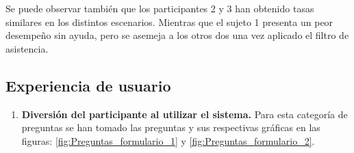Se puede observar también que los participantes 2 y 3 han obtenido tasas
similares en los distintos escenarios. Mientras que el sujeto 1 presenta un
peor desempeño sin ayuda, pero se asemeja a los otros dos una vez aplicado el
filtro de asistencia.

\subsection{Experiencia de usuario}
\label{subsec:rt_analisis_experiencia_usuario}

\begin{enumerate}
      \item \textbf{Diversión del participante al utilizar el sistema.} Para esta categoría de preguntas se han tomado las preguntas y sus respectivas gráficas en las figuras: \ref{fig:Preguntas_formulario_1} y \ref{fig:Preguntas_formulario_2}.


\end{enumerate}
